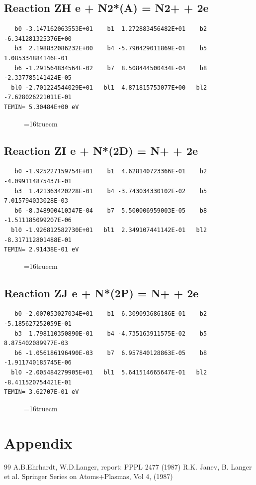 \documentclass[12pt,dvipdfm]{article}
\begin{document}
\subsection{
Reaction ZH e + N2*(A) = N2+ + 2e}
\begin{small}\begin{verbatim}
   b0 -3.147162063553E+01    b1  1.272883456482E+01    b2 -6.341281325376E+00
   b3  2.198832086232E+00    b4 -5.790429011869E-01    b5  1.085334884146E-01
   b6 -1.291564834564E-02    b7  8.508444500434E-04    b8 -2.337785141424E-05
  bl0 -2.701224544029E+01   bl1  4.871815753077E+00   bl2 -7.628026221011E-01
TEMIN= 5.30484E+00 eV
   \end{verbatim}\end{small}
\begin{figure}[h!]
\label{n2rates}
\epsfxsize=16truecm
\end{figure}
\newpage

\subsection{
Reaction ZI e + N*(2D) = N+ + 2e}
\begin{small}\begin{verbatim}
   b0 -1.925227159754E+01    b1  4.628140723366E-01    b2 -4.099114875437E-01
   b3  1.421363420228E-01    b4 -3.743034330102E-02    b5  7.015794033028E-03
   b6 -8.348900410347E-04    b7  5.500006959003E-05    b8 -1.511185099207E-06
  bl0 -1.926812582730E+01   bl1  2.349107441142E-01   bl2 -8.317112801488E-01
TEMIN= 2.91438E-01 eV
   \end{verbatim}\end{small}
\begin{figure}[h!]
\label{n2rates}
\epsfxsize=16truecm
\end{figure}
\newpage

\subsection{
Reaction ZJ e + N*(2P) = N+ + 2e}
\begin{small}\begin{verbatim}
   b0 -2.007053027034E+01    b1  6.309093686186E-01    b2 -5.185627252059E-01
   b3  1.798110350890E-01    b4 -4.735163911575E-02    b5  8.875402089977E-03
   b6 -1.056186196490E-03    b7  6.957840128863E-05    b8 -1.911740185745E-06
  bl0 -2.005484279905E+01   bl1  5.641514665647E-01   bl2 -8.411520754421E-01
TEMIN= 3.62707E-01 eV
   \end{verbatim}\end{small}
\begin{figure}[h!]
\label{n2rates}
\epsfxsize=16truecm
\end{figure}
\newpage


\section{Appendix}
\newpage
\begin{thebibliography}{99}
  A.B.Ehrhardt, W.D.Langer, report: PPPL 2477
                       (1987)
 R.K. Janev, B. Langer et al.  Springer Series on Atoms+Plasmas,
                   Vol 4, (1987)
 \end{thebibliography}
\end{document}
